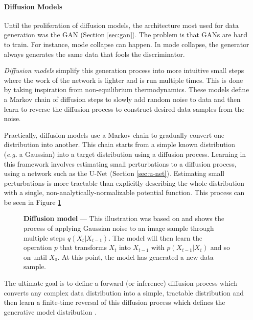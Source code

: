 \paragraph{Diffusion Models} \label{sec:diffusion}

Until the proliferation of diffusion models, the architecture most used for data generation was the \ac{GAN} (Section \ref{sec:gan}). The problem is that \acp{GAN} are hard to train. For instance, mode collapse can happen. In mode collapse, the generator always generates the same data that fools the discriminator.

\textit{Diffusion models} \cite{sohl-dickstein_deep_2015} simplify this generation process into more intuitive small steps where the work of the network is lighter and is run multiple times. This is done by taking inspiration from non-equilibrium thermodynamics. These models define a Markov chain of diffusion steps to slowly add random noise to data and then learn to reverse the diffusion process to construct desired data samples from the noise.

Practically, diffusion models use a Markov chain to gradually convert one distribution into another. This chain starts from a simple known distribution (\textit{e.g.} a Gaussian) into a target distribution using a diffusion process. Learning in this framework involves estimating small perturbations to a diffusion process, using a network such as the U-Net (Section \ref{sec:u-net}). Estimating small perturbations is more tractable than explicitly describing the whole distribution with a single, non-analytically-normalizable potential function. This process can be seen in Figure \ref{fig:diffusion}

\begin{figure}[ht]
    \centering
    \caption[Diffusion model]{\textbf{Diffusion model} --- This illustration was based on \cite{ho_denoising_2020} and shows the process of applying Gaussian noise to an image sample through multiple steps $q(X_t|X_{t-1})$. The model will then learn the operation $p$ that transforms $X_t$ into $X_{t-1}$ with $p(X_{t-1}|X_t)$ and so on until $X_0$. At this point, the model has generated a new data sample.}
    \label{fig:diffusion}
\end{figure}

The ultimate goal is to define a forward (or inference) diffusion process which converts any complex data distribution into a simple, tractable distribution and then learn a finite-time reversal of this diffusion process which defines the generative model distribution \cite{sohl-dickstein_deep_2015}.

